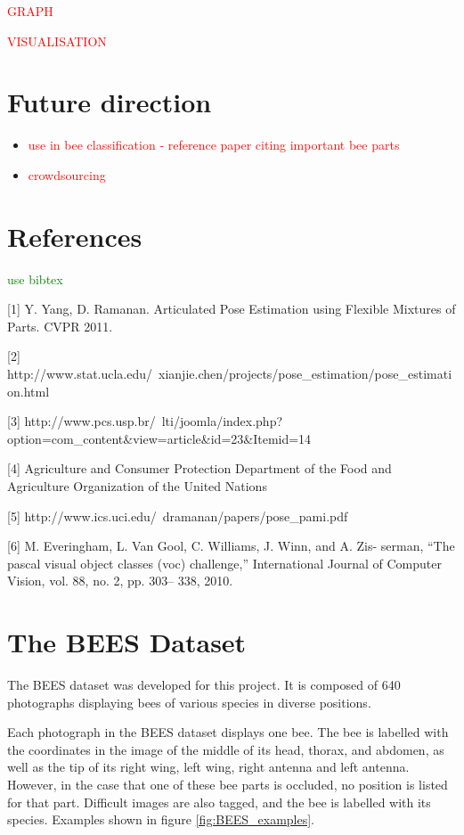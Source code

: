 \documentclass[11pt, oneside]{report}
\newcommand{\comment}[1]{\textcolor{red}{#1}}
\newcommand{\pcomment}[1]{\textcolor{green}{#1}}
\begin{document}
        \comment{GRAPH}

        \comment{VISUALISATION}

\chapter{Future direction}
    \begin{itemize}
    \item
        \comment{use in bee classification - reference paper citing important bee parts}
    \item
        \comment{crowdsourcing}
    \end{itemize}

\chapter{References}
\pcomment{use bibtex}

[1] Y. Yang, D. Ramanan. Articulated Pose Estimation using Flexible Mixtures of Parts. CVPR 2011.

[2] http://www.stat.ucla.edu/~xianjie.chen/projects/pose\_estimation/pose\_estimation.html

[3] http://www.pcs.usp.br/~lti/joomla/index.php?option=com\_content\&view=article\&id=23\&Itemid=14

[4] Agriculture and Consumer Protection Department of the Food and Agriculture Organization of the United Nations

[5] http://www.ics.uci.edu/~dramanan/papers/pose\_pami.pdf

[6] M. Everingham, L. Van Gool, C. Williams, J. Winn, and A. Zis- serman, “The pascal visual object classes (voc) challenge,”
International Journal of Computer Vision, vol. 88, no. 2, pp. 303–
338, 2010.



\appendix
\chapter{The BEES Dataset}
    The BEES dataset was developed for this project. It is composed of 640 photographs displaying bees of various species in diverse positions.

    Each photograph in the BEES dataset displays one bee. The bee is labelled with the coordinates in the image of the middle of its head, thorax, and abdomen, as well as the tip of its right wing, left wing, right antenna and left antenna. However, in the case that one of these bee parts is occluded, no position is listed for that part. Difficult images are also tagged, and the bee is labelled with its species. Examples shown in figure \ref{fig:BEES_examples}.
\end{document}
